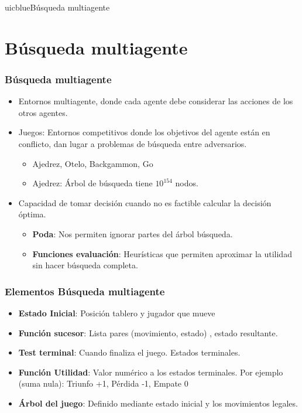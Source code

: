 \documentclass[xcolor=table]{beamer}
\begin{document}
\begin{chapter}{uicblue}{Búsqueda multiagente}
\end{chapter}

\section{Búsqueda multiagente}


\begin{frame} \frametitle{Búsqueda multiagente} \small

\begin{itemize}
    \item  Entornos multiagente, donde cada agente debe considerar las acciones de los otros agentes. 
     \item  Juegos: Entornos competitivos donde los objetivos del agente están en conflicto, dan lugar a problemas de búsqueda entre adversarios.
      \begin{itemize}
        \item Ajedrez, Otelo, Backgammon, Go
        \item Ajedrez: Árbol de búsqueda tiene $10^{154}$ nodos.
        \end{itemize}

\item   Capacidad de tomar decisión cuando no es factible calcular la decisión óptima. 

        \begin{itemize}
        \item \textbf{Poda}: Nos permiten ignorar partes del árbol búsqueda.
        \item \textbf{Funciones evaluación}: Heurísticas que permiten aproximar la utilidad sin hacer búsqueda completa.
        \end{itemize}


\end{itemize}


\end{frame} 


\begin{frame} \frametitle{Elementos Búsqueda multiagente} \small

\begin{itemize}
    \item  \textbf{Estado Inicial}: Posición tablero y jugador que mueve
    \item  \textbf{Función sucesor}: Lista pares (movimiento, estado) , estado resultante.
    \item  \textbf{Test terminal}: Cuando finaliza el juego. Estados terminales.
    \item  \textbf{Función Utilidad}: Valor numérico a los estados terminales.
Por ejemplo (suma nula): Triunfo +1, Pérdida -1, Empate 0 
   \item \textbf{Árbol del juego}: Definido mediante estado inicial y los movimientos legales.

\end{itemize}

\end{frame} 
\end{document}
